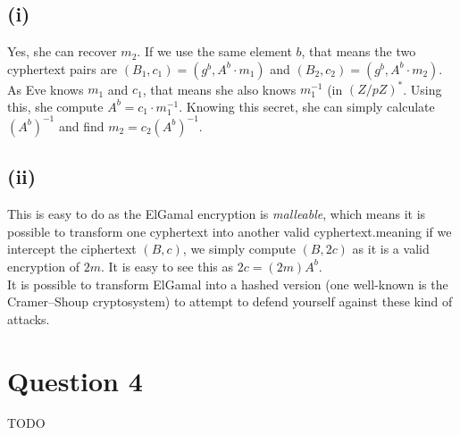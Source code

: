 \documentclass[a4paper, fleqn]{article}
\begin{document}
\subsection{(i)}
Yes, she can recover $m_2$. If we use the same element $b$, that means the two cyphertext pairs are $(B_1, c_1) = (g^b, A^b\cdot m_1)$ and $(B_2, c_2)=(g^b, A^b\cdot m_2)$. As Eve knows $m_1$ and $c_1$, that means she also knows $m_1^{-1}$ (in $(Z/pZ)^*$. Using this, she compute $A^b=c_1\cdot m_1^{-1}$. Knowing this secret, she can simply calculate $(A^b)^{-1}$ and find $m_2=c_2(A^b)^{-1}$.

\subsection{(ii)}
This is easy to do as the ElGamal encryption is \textit{malleable}, which means it is possible to transform one cyphertext into another valid cyphertext.meaning if we intercept the ciphertext $(B, c)$, we simply compute $(B, 2c)$ as it is a valid encryption of $2m$. It is easy to see this as $2c=(2m)A^b$. \\
It is possible to transform ElGamal into a hashed version (one well-known is the Cramer–Shoup cryptosystem) to attempt to defend yourself against these kind of attacks.

\section{Question 4}
TODO
\end{document}
